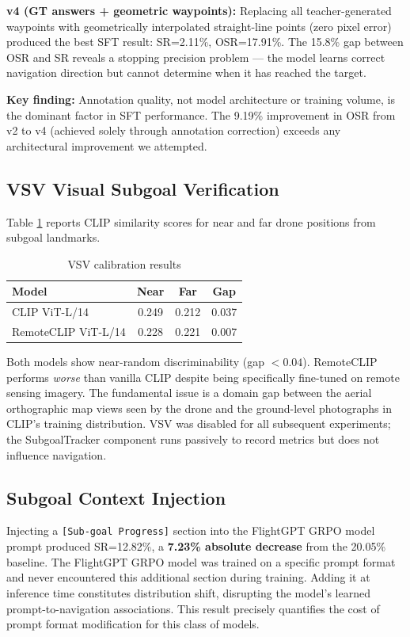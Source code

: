 \documentclass[conference]{IEEEtran}
\begin{document}
\textbf{v4 (GT answers + geometric waypoints):} Replacing all teacher-generated waypoints with geometrically interpolated straight-line points (zero pixel error) produced the best SFT result: SR=2.11\%, OSR=17.91\%. The 15.8\% gap between OSR and SR reveals a stopping precision problem --- the model learns correct navigation direction but cannot determine when it has reached the target.

\textbf{Key finding:} Annotation quality, not model architecture or training volume, is the dominant factor in SFT performance. The 9.19\% improvement in OSR from v2 to v4 (achieved solely through annotation correction) exceeds any architectural improvement we attempted.

\subsection{VSV Visual Subgoal Verification}

Table \ref{tab:vsv} reports CLIP similarity scores for near and far drone positions from subgoal landmarks.

\begin{table}[h]
\centering
\caption{VSV calibration results}
\label{tab:vsv}
\begin{tabular}{lccc}
\toprule
Model & Near & Far & Gap \\
\midrule
CLIP ViT-L/14 \cite{clip} & 0.249 & 0.212 & 0.037 \\
RemoteCLIP ViT-L/14 \cite{remoteclip} & 0.228 & 0.221 & 0.007 \\
\bottomrule
\end{tabular}
\end{table}

Both models show near-random discriminability (gap $< 0.04$). RemoteCLIP performs \textit{worse} than vanilla CLIP despite being specifically fine-tuned on remote sensing imagery. The fundamental issue is a domain gap between the aerial orthographic map views seen by the drone and the ground-level photographs in CLIP's training distribution. VSV was disabled for all subsequent experiments; the SubgoalTracker component runs passively to record metrics but does not influence navigation.

\subsection{Subgoal Context Injection}

Injecting a \texttt{[Sub-goal Progress]} section into the FlightGPT GRPO model prompt produced SR=12.82\%, a \textbf{7.23\% absolute decrease} from the 20.05\% baseline. The FlightGPT GRPO model was trained on a specific prompt format and never encountered this additional section during training. Adding it at inference time constitutes distribution shift, disrupting the model's learned prompt-to-navigation associations. This result precisely quantifies the cost of prompt format modification for this class of models.
\end{document}

